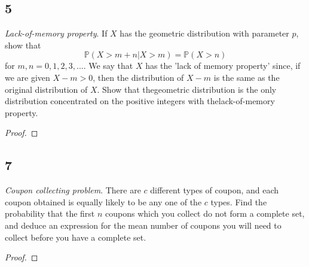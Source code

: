 \documentclass{article}
\renewcommand{\P}{\mathbb{P}}
\begin{document}
    \subsection*{5}
    \textit{Lack-of-memory property}. If $X$ has the geometric distribution with parameter
    $p$, show that $$\P(X > m + n | X > m) = \P(X > n)$$ for $m,n=0,1,2,3,...$.
    We say that $X$ has the 'lack of memory property' since, if we are given
    $X-m > 0$, then the distribution of $X-m$ is the same as the original distribution
    of $X$. Show that thegeometric distribution is the only distribution concentrated on the
    positive integers with thelack-of-memory property.
    \begin{proof}
        
    \end{proof}
    \subsection*{7}
    \textit{Coupon collecting problem}. There are $c$ different types of coupon,
    and each coupon obtained is equally likely to be any one of the $c$ types. Find the
    probability that the first $n$ coupons which you collect do not form a complete set,
    and deduce an expression for the mean number of coupons you will need to collect
    before you have a complete set.
    \begin{proof}
        
    \end{proof}
\end{document}
